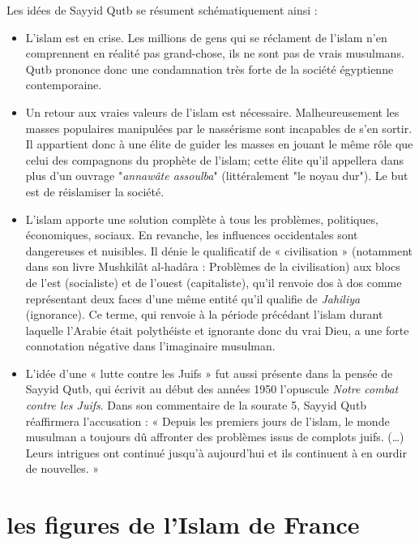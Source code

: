 Les idées de Sayyid Qutb se résument schématiquement ainsi :
\begin{itemize}
    \item 
L'islam est en crise. Les millions de gens qui se réclament de l'islam n'en comprennent en réalité pas grand-chose, ils ne sont pas de vrais musulmans. Qutb prononce donc une condamnation très forte de la société égyptienne contemporaine.
  \item 
Un retour aux vraies valeurs de l'islam est nécessaire. Malheureusement les masses populaires manipulées par le nassérisme sont incapables de s’en sortir. Il appartient donc à une élite de guider les masses en jouant le même rôle que celui des compagnons du prophète de l'islam; cette élite qu'il appellera dans plus d'un ouvrage "\textit{annawâte assoulba}" (littéralement "le noyau dur"). Le but est de réislamiser la société.
  \item 
L'islam apporte une solution complète à tous les problèmes, politiques, économiques, sociaux. En revanche, les influences occidentales sont dangereuses et nuisibles. Il dénie le qualificatif de « civilisation » (notamment dans son livre Mushkilât al-hadâra : Problèmes de la civilisation) aux blocs de l'est (socialiste) et de l'ouest (capitaliste), qu'il renvoie dos à dos comme représentant deux faces d'une même entité qu'il qualifie de \textit{Jahiliya} (ignorance). Ce terme, qui renvoie à la période précédant l'islam durant laquelle l'Arabie était polythéiste et ignorante donc du vrai Dieu, a une forte connotation négative dans l'imaginaire musulman.
  \item 
L'idée d'une « lutte contre les Juifs » fut aussi présente dans la pensée de Sayyid Qutb, qui écrivit au début des années 1950 l'opuscule \textit{Notre combat contre les Juifs}. Dans son commentaire de la sourate 5, Sayyid Qutb réaffirmera l’accusation : « Depuis les premiers jours de l’islam, le monde musulman a toujours dû affronter des problèmes issus de complots juifs. (…) Leurs intrigues ont continué jusqu’à aujourd’hui et ils continuent à en ourdir de nouvelles. » 
\end{itemize}




\section{les figures de l'Islam de France}
\label{sec:figuresIslamFrance}
\mn{\CB}
